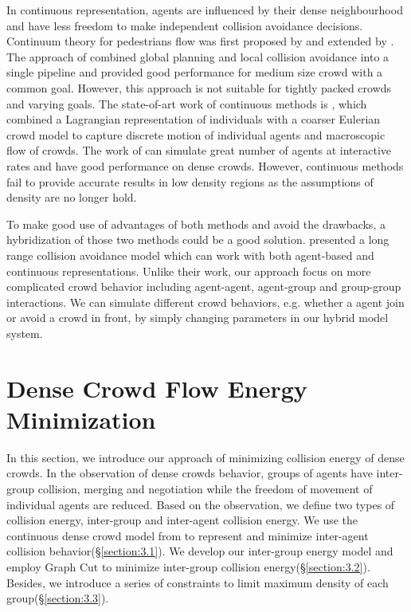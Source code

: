 \documentclass{egpubl}
\begin{document}
In continuous representation, agents are influenced by their dense neighbourhood and have less freedom to make independent collision avoidance decisions. Continuum theory for pedestrians flow was first proposed by \cite{Hughes:2003} and extended by \cite{Treuille:2006}. The approach of \cite{Treuille:2006} combined global planning and local collision avoidance into a single pipeline and provided good performance for medium size crowd with a common goal. However, this approach is not suitable for tightly packed crowds and varying goals. The state-of-art work of continuous methods is \cite{Narain:2009}, which combined a Lagrangian representation of individuals with a coarser Eulerian crowd model to capture discrete motion of individual agents and macroscopic flow of crowds. The work of \cite{Narain:2009} can simulate great number of agents at interactive rates and have good performance on dense crowds. However, continuous methods fail to provide accurate results in low density regions as the assumptions of density are no longer hold. 

To make good use of advantages of both methods and avoid the drawbacks, a hybridization of those two methods could be a good solution. \cite{Golas:2013} presented a long range collision avoidance model which can work with both agent-based and continuous representations. Unlike their work, our approach focus on more complicated crowd behavior including agent-agent, agent-group and group-group interactions. We can simulate different crowd behaviors, e.g. whether a agent join or avoid a crowd in front, by simply changing parameters in our hybrid model system. 


\section{Dense Crowd Flow Energy Minimization}
\label{section:3}

In this section, we introduce our approach of minimizing collision energy of dense crowds. In the observation of dense crowds behavior, groups of agents have inter-group collision, merging and negotiation while the freedom of movement of individual agents are reduced\cite{Treuille:2006,Narain:2009,Golas:2013}. Based on the observation, we define two types of collision energy, inter-group and inter-agent collision energy. We use the continuous dense crowd model from \cite{Narain:2009} to represent and minimize inter-agent collision behavior(\S\ref{section:3.1}). We develop our inter-group energy model and employ Graph Cut to minimize inter-group collision energy(\S\ref{section:3.2}). Besides, we introduce a series of constraints to limit maximum density of each group(\S\ref{section:3.3}). 
\end{document}
